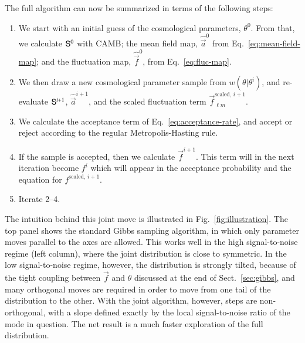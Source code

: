 \documentclass[twocolumn]{../common/aa}
\renewcommand{\a}[0]{\vec{a}}
\newcommand{\f}[0]{\vec{f}}
\renewcommand{\S}[0]{\tens{S}}
\begin{document}
The full algorithm can now be summarized in terms of the following steps:
\begin{enumerate}
    \item We start with an initial guess of the cosmological parameters, $\theta^0$. From that, we calculate $\S^0$ with CAMB; the mean field map, $\hat{\a}^0$ from Eq.~\ref{eq:mean-field-map}; and the fluctuation map, $\hat{\f}^0$, from Eq.~\eqref{eq:fluc-map}.
    \item We then draw a new cosmological parameter sample from $w(\theta|\theta^i)$, and re-evaluate $\S^{i+1}$, $\hat{\a}^{i+1}$, and the scaled fluctuation term $\f_{\ell m}^{\textrm{scaled},\, i+1}$.
    \item We calculate the acceptance term of Eq.~\eqref{eq:acceptance-rate}, and accept or reject according to the regular Metropolis-Hasting rule.
    \item If the sample is accepted, then we calculate $\f^{i+1}$. This term will in the next iteration become $f^{i}$ which will appear in the acceptance probability and the equation for $f^{\textrm{scaled},\, i+1}$. 
    \item Iterate 2--4.
\end{enumerate}

The intuition behind this joint move is illustrated in Fig.~\ref{fig:illustration}. The top panel shows the standard Gibbs sampling algorithm, in which only parameter moves parallel to the axes are allowed. This works well in the high signal-to-noise regime (left column), where the joint distribution is close to symmetric. In the low signal-to-noise regime, however, the distribution is strongly tilted, because of the tight coupling between $\f$ and $\theta$ discussed at the end of Sect.~\ref{sec:gibbs}, and many orthogonal moves are required in order to move from one tail of the distribution to the other. With the joint algorithm, however, steps are non-orthogonal, with a slope defined exactly by the local signal-to-noise ratio of the mode in question. The net result is a much faster exploration of the full distribution.
\end{document}
